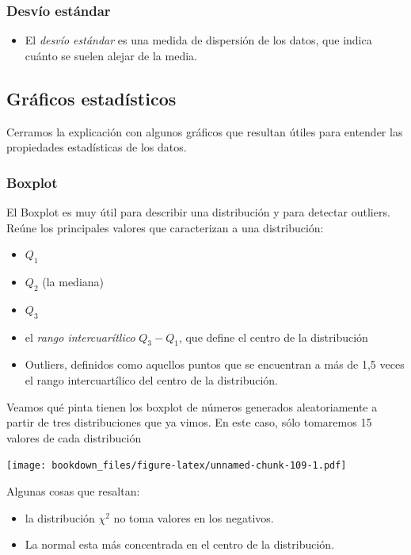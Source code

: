 \documentclass[]{book}
\providecommand{\tightlist}{%
  \setlength{\itemsep}{0pt}\setlength{\parskip}{0pt}}
\begin{document}
\hypertarget{desvio-estandar}{%
\subsubsection{Desvío estándar}\label{desvio-estandar}}

\begin{itemize}
\tightlist
\item
  El \emph{desvío estándar} es una medida de dispersión de los datos, que indica cuánto se suelen alejar de la media.
\end{itemize}

\hypertarget{graficos-estadisticos}{%
\subsection{Gráficos estadísticos}\label{graficos-estadisticos}}

Cerramos la explicación con algunos gráficos que resultan útiles para entender las propiedades estadísticas de los datos.

\hypertarget{boxplot}{%
\subsubsection{Boxplot}\label{boxplot}}

El Boxplot es muy útil para describir una distribución y para detectar outliers. Reúne los principales valores que caracterizan a una distribución:

\begin{itemize}
\tightlist
\item
  \(Q_1\)
\item
  \(Q_2\) (la mediana)
\item
  \(Q_3\)
\item
  el \emph{rango intercuarítlico} \(Q_3 - Q_1\), que define el centro de la distribución
\item
  Outliers, definidos como aquellos puntos que se encuentran a más de 1,5 veces el rango intercuartílico del centro de la distribución.
\end{itemize}

Veamos qué pinta tienen los boxplot de números generados aleatoriamente a partir de tres distribuciones que ya vimos. En este caso, sólo tomaremos 15 valores de cada distribución

\texttt{[image: bookdown\_files/figure-latex/unnamed-chunk-109-1.pdf]}

Algunas cosas que resaltan:

\begin{itemize}
\tightlist
\item
  la distribución \(\chi^2\) no toma valores en los negativos.
\item
  La normal esta más concentrada en el centro de la distribución.
\end{itemize}
\end{document}
